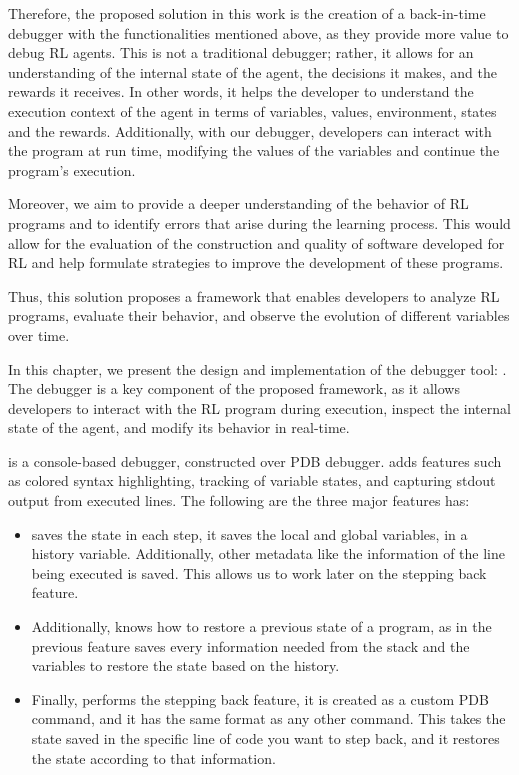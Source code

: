 Therefore, the proposed solution in this work is the creation of a back-in-time debugger with the 
functionalities mentioned above, as they provide more value to debug \ac{RL} agents. This 
is not a traditional debugger; rather, it allows for an understanding of the 
internal state of the agent, the decisions it makes, and the rewards it 
receives. In other words, it helps the developer to understand the execution context of the
agent in terms of variables, values, environment, states and the rewards. Additionally, with 
our debugger, developers can interact with the program at run time, modifying the values 
of the variables and continue the program's execution.

Moreover, we aim to provide a deeper understanding of the behavior of 
RL programs and to identify errors that arise during the learning process. 
This would allow for the evaluation of the construction and quality of 
software developed for RL and help formulate strategies to improve the 
development of these programs.

Thus, this solution proposes a framework that enables developers to 
analyze RL programs, evaluate their behavior, and observe the evolution 
of different variables over time.

In this chapter, we present the design and implementation of the debugger tool: \flik.
The debugger is a key component of the proposed framework, as it allows 
developers to interact with the RL program during execution, inspect the 
internal state of the agent, and modify its behavior in real-time.

\flik is a console-based debugger, constructed over \ac{PDB} debugger. \flik adds features 
such as colored syntax highlighting, tracking of variable states, and capturing stdout output 
from executed lines. The following are the three major features \flik has:
\begin{itemize}
    \item \flik saves the state in each step, it saves the local and global variables, 
    in a history variable. Additionally, other metadata like the information of the line 
    being executed is saved. This allows us to work later on the stepping back feature. 
    \item Additionally, \flik knows how to restore a previous state of a program, as 
    in the previous feature saves every information needed from the stack and the variables 
    to restore the state based on the history. 
    \item Finally, \flik performs the stepping back feature, it is created as a custom 
    \ac{PDB} command, and it has the same format as any other command. This takes the state
    saved in the specific line of code you want to step back, and it restores the state according
    to that information. 
\end{itemize}

